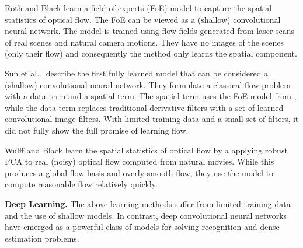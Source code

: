 \documentclass[10pt,twocolumn,letterpaper]{article}
\begin{document}
Roth and Black \cite{roth2009fields} learn a field-of-experts (FoE) model to capture the spatial statistics of optical flow.
The FoE can be viewed as a (shallow) convolutional neural network.
The model is trained using flow fields generated from laser scans of real scenes and natural camera motions.
They have no images of the scenes (only their flow) and consequently the method only learns the spatial component.%

Sun et al.~\cite{roth2008learning} describe the first fully learned model that can be considered a (shallow) convolutional neural network.  
They formulate a classical flow problem with a data term and a spatial term.  The spatial term uses the FoE model from \cite{roth2009fields}, while the data term replaces traditional derivative filters with a set of learned convolutional image filters. %
With limited training data and a small set of filters, it did not fully show the full promise of learning flow.%


Wulff and Black \cite{wulff2015efficient} learn the spatial statistics of optical flow by a
applying robust PCA \cite{Hauberg:PAMI:2015} to real (noisy) optical flow computed from natural movies.
While this produces a global flow basis and overly smooth flow, 
they use the model to compute reasonable flow relatively quickly.






{\bf Deep Learning.} 
The above learning methods suffer from limited training data and the use of shallow models.
In contrast, deep convolutional neural networks have emerged as a powerful class of models for solving recognition \cite{he2015deep,szegedy2015going} and dense estimation \cite{chen2014semantic,long2015fully} problems. %

\end{document}
